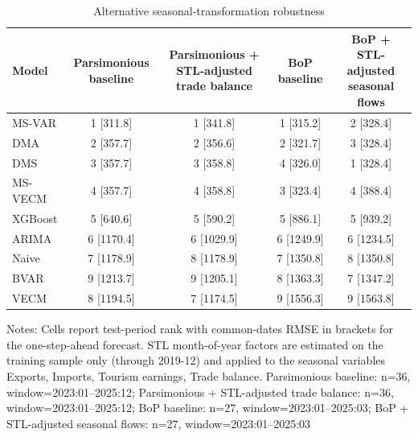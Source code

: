 \begin{table}[htbp]
\centering
\scriptsize
\caption{Alternative seasonal-transformation robustness}
\label{tab:transformation_robustness}
\begin{tabular}{lcccc}
\toprule
Model & Parsimonious baseline & Parsimonious + STL-adjusted trade balance & BoP baseline & BoP + STL-adjusted seasonal flows \\
\midrule
MS-VAR & 1 [311.8] & 1 [341.8] & 1 [315.2] & 2 [328.4] \\
DMA & 2 [357.7] & 2 [356.6] & 2 [321.7] & 3 [328.4] \\
DMS & 3 [357.7] & 3 [358.8] & 4 [326.0] & 1 [328.4] \\
MS-VECM & 4 [357.7] & 4 [358.8] & 3 [323.4] & 4 [388.4] \\
XGBoost & 5 [640.6] & 5 [590.2] & 5 [886.1] & 5 [939.2] \\
ARIMA & 6 [1170.4] & 6 [1029.9] & 6 [1249.9] & 6 [1234.5] \\
Naive & 7 [1178.9] & 8 [1178.9] & 7 [1350.8] & 8 [1350.8] \\
BVAR & 9 [1213.7] & 9 [1205.1] & 8 [1363.3] & 7 [1347.2] \\
VECM & 8 [1194.5] & 7 [1174.5] & 9 [1556.3] & 9 [1563.8] \\
\bottomrule
\end{tabular}
\begin{tablenotes}
\footnotesize
\item Notes: Cells report test-period rank with common-dates RMSE in brackets for the one-step-ahead forecast. STL month-of-year factors are estimated on the training sample only (through 2019-12) and applied to the seasonal variables Exports, Imports, Tourism earnings, Trade balance. Parsimonious baseline: n=36, window=2023:01--2025:12; Parsimonious + STL-adjusted trade balance: n=36, window=2023:01--2025:12; BoP baseline: n=27, window=2023:01--2025:03; BoP + STL-adjusted seasonal flows: n=27, window=2023:01--2025:03
\end{tablenotes}
\end{table}